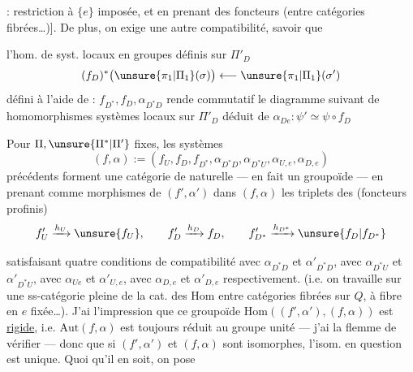 : restriction à $\{e\}$ imposée, et en prenant des foncteurs
 (entre catégories fibrées\ldots)].
De plus, on exige une autre compatibilité, savoir que


 l'hom. de syst. locaux en groupes définis sur $\Pi'_D$
\[
(f_D)^*\bigl(\unsure{\pi_1|\Pi_1}(\sigma)\bigr)
\longleftarrow \unsure{\pi_1|\Pi_1}(\sigma')
\]
défini à l'aide de : $f_{D^*},f_D,\alpha_{D^*D}$
rende commutatif le diagramme suivant de
 homomorphismes 
 systèmes locaux sur $\Pi'_D$
déduit de $\alpha_{De}:\psi'\simeq\psi\circ f_D$


Pour $\Pi,\unsure{\Pi^*|\Pi'}$ fixes, les systèmes
\[
(f,\alpha):=(f_U,f_D,f_{D^*},\alpha_{D^*D},\alpha_{D^*U},
\alpha_{U,e},\alpha_{D,e})
\]
précédents forment une catégorie de  naturelle
--- en fait un groupoïde --- en prenant comme morphismes
 de $(f',\alpha')$ dans $(f,\alpha)$
les triplets des 
(foncteurs profinis)
\[
f'_U\xrightarrow{h_U}\unsure{f_U},\qquad
f'_D\xrightarrow{h_D}f_D,\qquad
f'_{D^*}\xrightarrow{h_{D^*}}\unsure{f_D|f_{D^*}}
\]


satisfaisant  quatre conditions de compatibilité avec
$\alpha_{D^*D}$ et $\alpha'_{D^*D}$, avec $\alpha_{D^*U}$ et
$\alpha'_{D^*U}$, avec $\alpha_{Ue}$ et $\alpha'_{U,e}$, avec
$\alpha_{D,e}$ et $\alpha'_{D,e}$ respectivement.
(i.e. on travaille sur une ss-catégorie pleine de la
 cat. des \uline{$\mathrm{Hom}$} entre catégories
fibrées sur $Q$, à fibre en $e$ fixée\ldots).
J'ai l'impression que ce groupoïde
\uline{$\mathrm{Hom}$}$((f',\alpha'),(f,\alpha))$ est
 \uline{rigide}, i.e.
$\mathrm{Aut}(f,\alpha)$ est toujours réduit au groupe unité
--- j'ai la flemme de vérifier --- donc que si $(f',\alpha')$ et
$(f,\alpha)$ sont isomorphes, l'isom. en question est unique.
Quoi qu'il en soit, on pose


